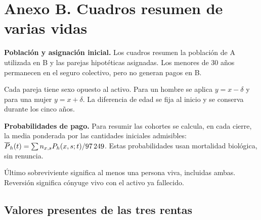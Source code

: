 \section*{Anexo B. Cuadros resumen de varias vidas}
\label{anexo:resumen-b}

\textbf{Población y asignación inicial.} Los cuadros resumen la población
de A utilizada en B y las parejas hipotéticas asignadas. Los menores de
30 años permanecen en el seguro colectivo, pero no generan pagos en B.

\begin{table}[htbp]
\centering
\small

\caption{Población inicial y admisibilidad de parejas en B. Unidad: personas
o parejas, según el concepto. Elaboración propia.}
\label{tab:b-poblacion}
\end{table}

\begin{table}[htbp]
\centering
\small

\caption{Parejas admisibles por banda de edad y sexo del activo.
La edad de la pareja muestra el intervalo observado al inicio. Elaboración propia.}
\label{tab:b-bandas}
\end{table}

Cada pareja tiene sexo opuesto al activo. Para un hombre se aplica
$y=x-\delta$ y para una mujer $y=x+\delta$. La diferencia de edad se fija
al inicio y se conserva durante los cinco años.

\textbf{Probabilidades de pago.} Para resumir las cohortes se calcula, en
cada cierre, la media ponderada por las cantidades iniciales admisibles:
$\overline{P}_h(t)=\sum n_{x,s}P_h(x,s;t)/97\,249$.
Estas probabilidades usan mortalidad biológica, sin renuncia.

\begin{table}[htbp]
\centering
\small

\caption{Probabilidad media de pago al cierre de cada año, ponderada
por las parejas iniciales. Elaboración propia.}
\label{tab:b-probabilidades}
\end{table}

Último sobreviviente significa al menos una persona viva, incluidas ambas.
Reversión significa cónyuge vivo con el activo ya fallecido.

\clearpage
\subsection*{Valores presentes de las tres rentas}

